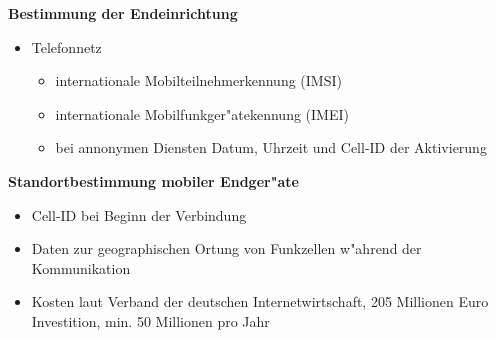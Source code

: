     \begin{frame}
      \textbf{Bestimmung der Endeinrichtung}
      \begin{itemize}
        \item Telefonnetz
        \begin{itemize}
          \item internationale Mobilteilnehmerkennung (IMSI)
          \item internationale Mobilfunkger"atekennung (IMEI)
          \item bei annonymen Diensten Datum, Uhrzeit und Cell-ID der Aktivierung
        \end{itemize}
      \end{itemize}
    \end{frame}

    \begin{frame}
      \textbf{Standortbestimmung mobiler Endger"ate}
      \begin{itemize}
        \item Cell-ID bei Beginn der Verbindung
        \item Daten zur geographischen Ortung von Funkzellen w"ahrend der Kommunikation
      \end{itemize}
    \end{frame}

    \begin{frame}
      \begin{itemize}
        \item Kosten laut Verband der deutschen Internetwirtschaft, 205 Millionen Euro Investition, min. 50 Millionen pro Jahr
      \end{itemize}
    \end{frame}
